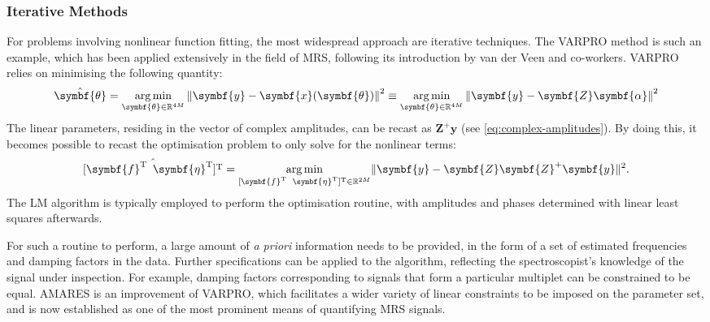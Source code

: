 \subsubsection{Iterative Methods}
For problems involving nonlinear function fitting, the most widespread approach
are iterative techniques. The \ac{VARPRO} method\cite{Golub1973} is such an
example, which has been applied extensively in the field of \ac{MRS}, following
its introduction by van der Veen and
co-workers\cite{VanDerVeen1988,Decannierec1994}. \ac{VARPRO}
relies on minimising the following quantity:
\begin{equation}
    \hat{\symbf{\theta}} = \argmin_{\symbf{\theta} \in \mathbb{R}^{4M}}
        \left \lVert \symbf{y} - \symbf{x}(\symbf{\theta}) \right \rVert^2 \equiv
        \argmin_{\symbf{\theta} \in \mathbb{R}^{4M}} \left \lVert \symbf{y} - \symbf{Z}\symbf{\alpha} \right \rVert^2
\end{equation}
The linear parameters, residing in the vector of complex amplitudes, can be
recast as $\symbf{Z}^+\symbf{y}$ (see \cref{eq:complex-amplitudes}). By doing
this, it becomes possible to recast the optimisation problem to only solve for
the nonlinear terms:
\begin{equation}
    \hat{[\symbf{f}\T \hspace*{5pt} \symbf{\eta}\T]\T} =
        \argmin_{[\symbf{f}\T \hspace*{5pt} \symbf{\eta}\T]\T \in \mathbb{R}^{2M}}
        \lVert \symbf{y} - \symbf{Z}\symbf{Z}^+\symbf{y} \rVert^2.
\end{equation}
The \ac{LM} algorithm\cite{Levenberg1944, Marquardt1963} is
typically employed to perform the optimisation routine, with amplitudes and
phases determined with linear least squares afterwards.

For such a routine to perform, a large amount of \textit{a priori} information
needs to be provided, in the form of a set of estimated frequencies and damping
factors in the data. Further specifications can be applied to the algorithm,
reflecting the spectroscopist's knowledge of the signal under
inspection. For example, damping factors corresponding to signals that form a
particular multiplet can be constrained to be equal.
\Ac{AMARES} is an improvement of \ac{VARPRO}, which facilitates a wider variety
of linear constraints to be imposed on the parameter set\cite{Vanhamme1997},
and is now established as one of the most prominent means of quantifying
\ac{MRS} signals.

